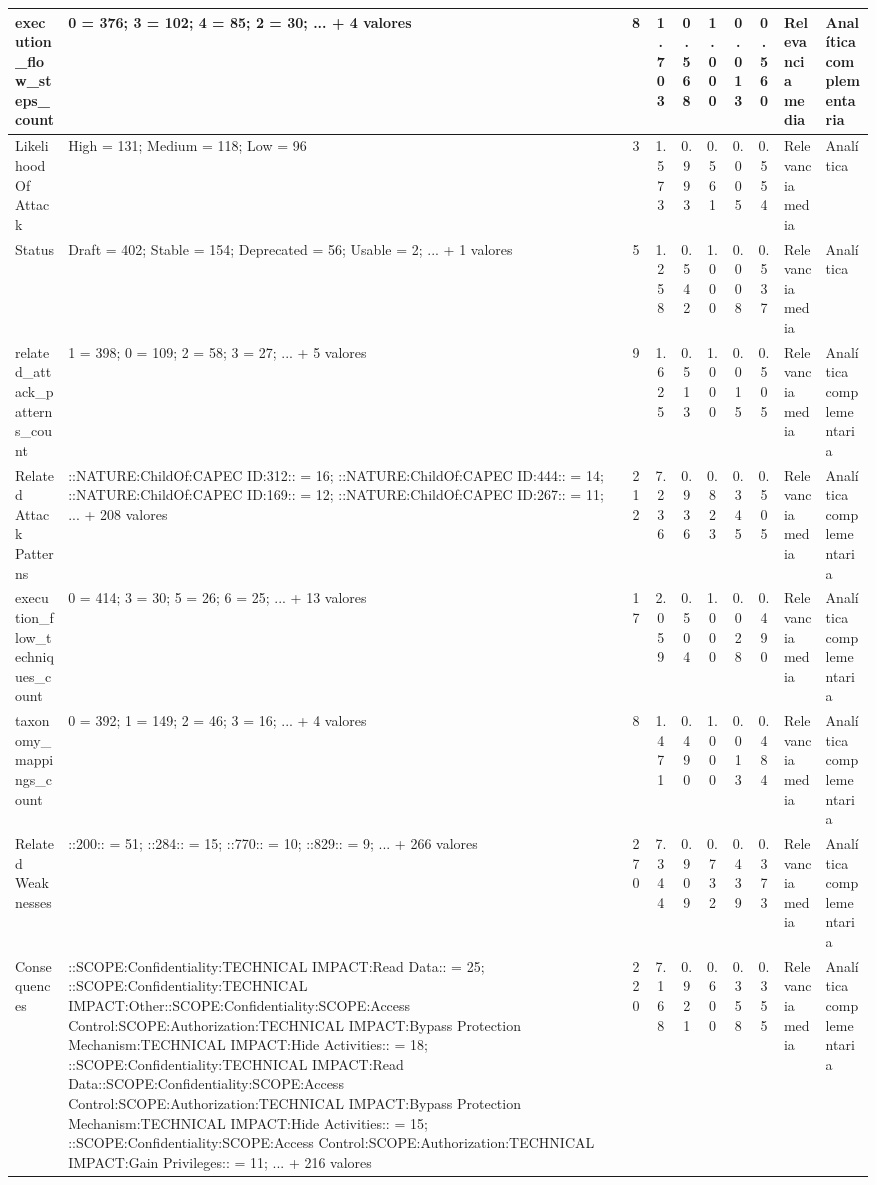 \begin{table}[h]
\begin{tabular}{|p{2.1cm}|p{3.0cm}|c|c|c|c|c|c|p{2.5cm}|p{2.8cm}|}
\hline
execution\_flow\_steps\_count & 0 = 376; 3 = 102; 4 = 85; 2 = 30; ... + 4 valores & 8 & 1.703 & 0.568 & 1.000 & 0.013 & 0.560 & Relevancia media & Analítica complementaria \\
\hline
Likelihood Of Attack & High = 131; Medium = 118; Low = 96 & 3 & 1.573 & 0.993 & 0.561 & 0.005 & 0.554 & Relevancia media & Analítica \\
\hline
Status & Draft = 402; Stable = 154; Deprecated = 56; Usable = 2; ... + 1 valores & 5 & 1.258 & 0.542 & 1.000 & 0.008 & 0.537 & Relevancia media & Analítica \\
\hline
related\_attack\_patterns\_count & 1 = 398; 0 = 109; 2 = 58; 3 = 27; ... + 5 valores & 9 & 1.625 & 0.513 & 1.000 & 0.015 & 0.505 & Relevancia media & Analítica complementaria \\
\hline
Related Attack Patterns & ::NATURE:ChildOf:CAPEC ID:312:: = 16; ::NATURE:ChildOf:CAPEC ID:444:: = 14; ::NATURE:ChildOf:CAPEC ID:169:: = 12; ::NATURE:ChildOf:CAPEC ID:267:: = 11; ... + 208 valores & 212 & 7.236 & 0.936 & 0.823 & 0.345 & 0.505 & Relevancia media & Analítica complementaria \\
\hline
execution\_flow\_techniques\_count & 0 = 414; 3 = 30; 5 = 26; 6 = 25; ... + 13 valores & 17 & 2.059 & 0.504 & 1.000 & 0.028 & 0.490 & Relevancia media & Analítica complementaria \\
\hline
taxonomy\_mappings\_count & 0 = 392; 1 = 149; 2 = 46; 3 = 16; ... + 4 valores & 8 & 1.471 & 0.490 & 1.000 & 0.013 & 0.484 & Relevancia media & Analítica complementaria \\
\hline
Related Weaknesses & ::200:: = 51; ::284:: = 15; ::770:: = 10; ::829:: = 9; ... + 266 valores & 270 & 7.344 & 0.909 & 0.732 & 0.439 & 0.373 & Relevancia media & Analítica complementaria \\
\hline
Consequences & ::SCOPE:Confidentiality:TECHNICAL IMPACT:Read Data:: = 25; ::SCOPE:Confidentiality:TECHNICAL IMPACT:Other::SCOPE:Confidentiality:SCOPE:Access Control:SCOPE:Authorization:TECHNICAL IMPACT:Bypass Protection Mechanism:TECHNICAL IMPACT:Hide Activities:: = 18; ::SCOPE:Confidentiality:TECHNICAL IMPACT:Read Data::SCOPE:Confidentiality:SCOPE:Access Control:SCOPE:Authorization:TECHNICAL IMPACT:Bypass Protection Mechanism:TECHNICAL IMPACT:Hide Activities:: = 15; ::SCOPE:Confidentiality:SCOPE:Access Control:SCOPE:Authorization:TECHNICAL IMPACT:Gain Privileges:: = 11; ... + 216 valores & 220 & 7.168 & 0.921 & 0.600 & 0.358 & 0.355 & Relevancia media & Analítica complementaria \\
\hline

\end{tabular}
\end{table}
